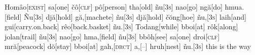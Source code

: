 
\let\\=\textsc

\noindent
\begingl
Hom\^{a}o[\\{exist}] sa[one]
\v{c}\^{o}[\\{clf}]
p\^{o}[person]
tha[old]
\~{n}u[\\{3s}]
nao[go]
ng\u{a}[do]
hmua.[field]
\~{N}u[\\{3s}]
dj\u{a}[hold]
g\u{a},[machete]
\~{n}u[\\{3s}]
dj\u{a}[hold]
\v{c}\u{o}ng[hoe]
\~{n}u,[\\{3s}]
laih[and]
gui[carry.on.back]
r\^{e}o[back.basket]
\~{n}u.[\\{3s}]
Todang[while]
bboi[at]
r\^{o}k[along]
jolan[trail]
\~{n}u[\\{3s}]
nao[go]
hma,[field]
\~{n}u[\\{3s}]
bb\^{o}h[see]
sa[one]
droi[\\{clf}]
mr\u{a}[peacock]
d\u{o}[stay]
bboi[at]
gah,[\\{drct}]
a,[--]
hruh[nest]
\~{n}u.[\\{3s}]
\endilg
this is the way
\endgl


